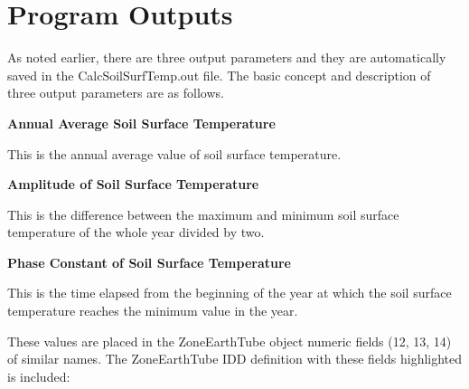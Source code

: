 \section{Program Outputs}\label{program-outputs}

As noted earlier, there are three output parameters and they are automatically saved in the CalcSoilSurfTemp.out file. The basic concept and description of three output parameters are as follows.

\textbf{Annual Average Soil Surface Temperature}

This is the annual average value of soil surface temperature.

\textbf{Amplitude of Soil Surface Temperature}

This is the difference between the maximum and minimum soil surface temperature of the whole year divided by two.

\textbf{Phase Constant of Soil Surface Temperature}

This is the time elapsed from the beginning of the year at which the soil surface temperature reaches the minimum value in the year.

These values are placed in the ZoneEarthTube object numeric fields (12, 13, 14) of similar names. The ZoneEarthTube IDD definition with these fields highlighted is included:

